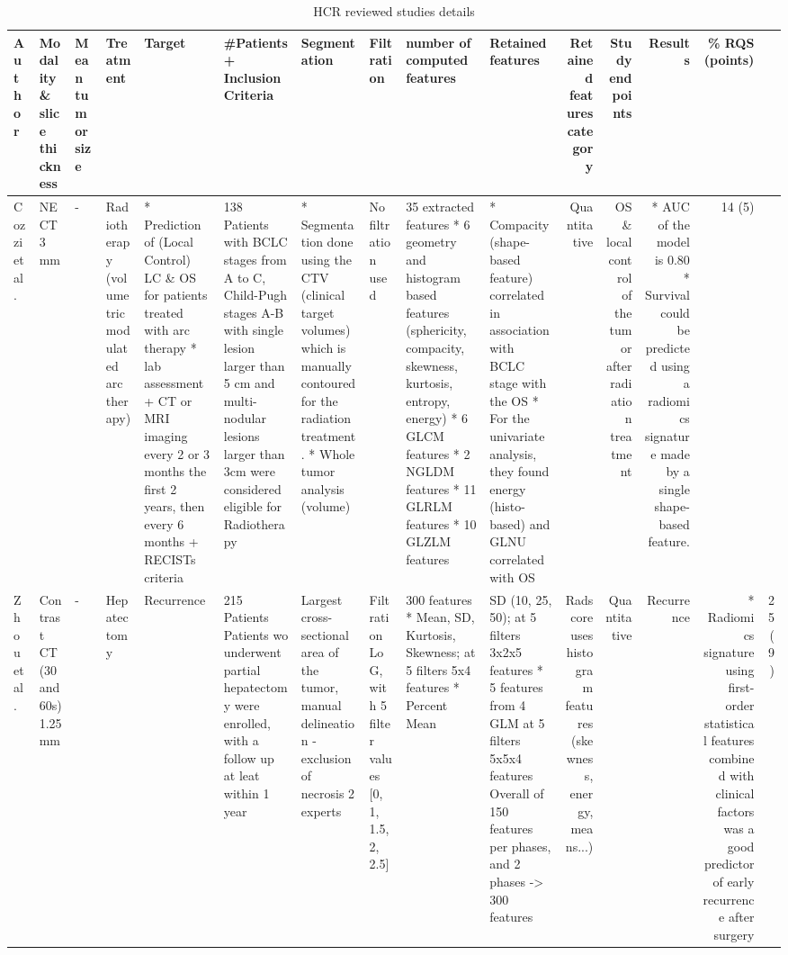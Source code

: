 \renewcommand{\arraystretch}{1}
\begin{landscape}
\begin{table}[!htp]\centering

\caption{HCR reviewed studies details}\label{tab:HCR_studies_details}
\tiny

\begin{tabular}{lp{1.5cm}p{1.5cm}p{2cm}p{2.5cm}p{3cm}p{3cm}p{2cm}p{3cm}p{2cm}rrrrr}\toprule
\textbf{Author} &\textbf{Modality \& slice thickness} &\textbf{Mean tumor size} &\textbf{Treatment} &\textbf{Target} &\textbf{\#Patients + Inclusion Criteria} &\textbf{Segmentation} &\textbf{Filtration} &\textbf{number of computed features} &\textbf{Retained features} &\textbf{Retained features category} &\textbf{Study endpoints} &\textbf{Results} &\textbf{\% RQS (points)} \\\midrule
Cozzi et al. &NECT 3 mm &- &Radiotherapy (volumetric modulated arc therapy) &* Prediction of (Local Control) LC \& OS for patients treated with arc therapy * lab assessment + CT or MRI imaging every 2 or 3 months the first 2 years, then every 6 months + RECISTs criteria &138 Patients with BCLC stages from A to C, Child-Pugh stages A-B with single lesion larger than 5 cm and multi-nodular lesions larger than 3cm were considered eligible for Radiotherapy &* Segmentation done using the CTV (clinical target volumes) which is manually contoured for the radiation treatment. * Whole tumor analysis (volume) &No filtration used &35 extracted features * 6 geometry and histogram based features (sphericity, compacity, skewness, kurtosis, entropy, energy) * 6 GLCM features * 2 NGLDM features * 11 GLRLM features * 10 GLZLM features &* Compacity (shape-based feature) correlated in association with BCLC stage with the OS * For the univariate analysis, they found energy (histo-based) and GLNU correlated with OS &Quantitative &OS \& local control of the tumor after radiation treatment &* AUC of the model is 0.80 * Survival could be predicted using a radiomics signature made by a single shape-based feature. &14 (5) \\
Zhou et al. &Contrast CT (30 and 60s) 1.25 mm &- &Hepatectomy &Recurrence &215 Patients Patients wo underwent partial hepatectomy were enrolled, with a follow up at leat within 1 year &Largest cross-sectional area of the tumor, manual delineation - exclusion of necrosis 2 experts &Filtration LoG, with 5 filter values [0, 1, 1.5, 2, 2.5] &300 features * Mean, SD, Kurtosis, Skewness; at 5 filters 5x4 features * Percent Mean & SD (10, 25, 50); at 5 filters 3x2x5 features * 5 features from 4 GLM at 5 filters 5x5x4 features Overall of 150 features per phases, and 2 phases -> 300 features &Radscore uses histogram features (skewness, energy, means...) &Quantitative &Recurrence &* Radiomics signature using first-order statistical features combined with clinical factors was a good predictor of early recurrence after surgery &25 (9) \\

\end{tabular}
\end{table}
\end{landscape}

